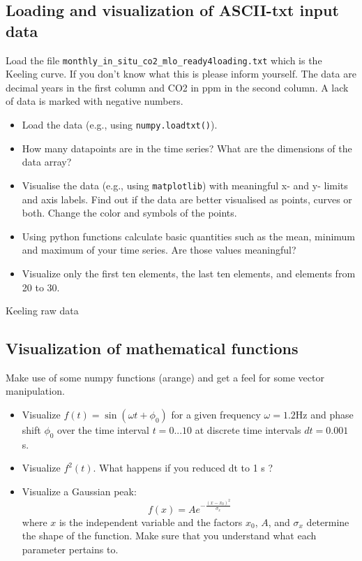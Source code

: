 \subsection{Loading and visualization of ASCII-txt input data}
\label{sec:viskeeling}
Load the file \verb|monthly_in_situ_co2_mlo_ready4loading.txt| which is the Keeling curve. If you don't know what this is please inform yourself. The data are decimal years in the first column and CO2 in ppm in the second column. A lack of data is marked with negative numbers.
\begin{itemize}
\item Load the data (e.g., using \verb|numpy.loadtxt()|).
\item How many datapoints are in the time series? What are the dimensions of the data array?
\item Visualise the data (e.g., using \verb|matplotlib|) with  meaningful x- and y- limits and axis labels. Find out if the data are better visualised as points, curves or both. Change the color and symbols of the points.
\item Using python functions calculate basic quantities such as the mean, minimum and maximum of your time series. Are those values meaningful?
\item Visualize only the first ten elements, the last ten elements, and elements from 20 to 30.
\end{itemize}
\ifanswers
\begin{tcolorbox}[enhanced jigsaw,breakable,pad at break*=1mm,
  colback=blue!5!white,colframe=babyblueeyes,title=Solutions,
  watermark color=white]
  Keeling raw data
  
\end{tcolorbox}
\fi


\subsection{Visualization of mathematical functions}
\label{sec:mathfunc}
Make use of some numpy functions (arange) and get a feel for some vector manipulation.
\begin{itemize}
  \item Visualize $f(t)=\sin(\omega t + \phi_0)$ for a given frequency $\omega=1.2$Hz and phase shift $\phi_0$ over the time interval $t=0...10$ at discrete time intervals $dt=0.001$ s.
  \item Visualize $f^2(t)$. What happens if you reduced dt to 1 s ?
  \item Visualize a Gaussian peak:
  $$
  f(x) = Ae^{-\frac{(x-x_0)^2}{\sigma_x}}
  $$
  where $x$ is the independent variable and the factors $x_0$, $A$, and $\sigma_x$ determine the shape of the function. Make sure that you understand what each parameter pertains to.
\end{itemize}

